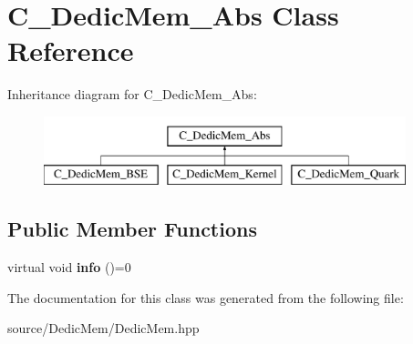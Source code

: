 \hypertarget{class_c___dedic_mem___abs}{\section{C\-\_\-\-Dedic\-Mem\-\_\-\-Abs Class Reference}
\label{class_c___dedic_mem___abs}
}
Inheritance diagram for C\-\_\-\-Dedic\-Mem\-\_\-\-Abs\-:\begin{figure}[H]
\begin{center}
\leavevmode
\includegraphics[height=2.000000cm]{class_c___dedic_mem___abs}
\end{center}
\end{figure}
\subsection*{Public Member Functions}
\begin{DoxyCompactItemize}
\item 
\hypertarget{class_c___dedic_mem___abs_a058cad18bf5cbc3e4d20272e41158f86}{virtual void {\bfseries info} ()=0}\label{class_c___dedic_mem___abs_a058cad18bf5cbc3e4d20272e41158f86}

\end{DoxyCompactItemize}


The documentation for this class was generated from the following file\-:\begin{DoxyCompactItemize}
\item 
source/\-Dedic\-Mem/Dedic\-Mem.\-hpp\end{DoxyCompactItemize}
